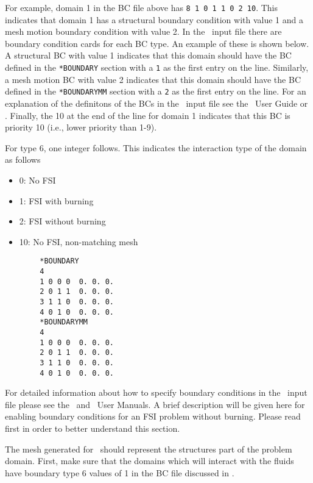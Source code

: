\begin{itemize}
\begin{itemize}
		For example, domain 1 in the BC file above has \texttt{8 1 0 1 1 0 2 10}. This indicates that domain 1 has a structural boundary condition with value 1 and a mesh motion boundary condition with value 2. In the \rocfrac\, input file there are boundary condition cards for each BC type. An example of these is shown below. A structural BC with value 1 indicates that this domain should have the BC defined in the \texttt{*BOUNDARY} section with a \texttt{1} as the first entry on the line. Similarly, a mesh motion BC with value 2 indicates that this domain should have the BC defined in the \texttt{*BOUNDARYMM} section with a \texttt{2} as the first entry on the line. For an explanation of the definitons of the BCs in the \rocfrac\, input file see the \rocfrac\, User Guide or . Finally, the 10 at the end of the line for domain 1 indicates that this BC is priority 10 (i.e., lower priority than 1-9).
	\end{itemize}
    For type 6, one integer follows. This indicates the interaction type of the domain as follows
    \begin{itemize}
    	\item 0: No FSI
    	\item 1: FSI with burning
    	\item 2: FSI without burning
    	\item 10: No FSI, non-matching mesh 
    \end{itemize}
\end{itemize}


	\begin{framed}
		\vspace{-10pt}
		\begin{verbatim}
		*BOUNDARY
		4
		1 0 0 0  0. 0. 0.
		2 0 1 1  0. 0. 0.
		3 1 1 0  0. 0. 0.
		4 0 1 0  0. 0. 0.
		*BOUNDARYMM
		4
		1 0 0 0  0. 0. 0.
		2 0 1 1  0. 0. 0.
		3 1 1 0  0. 0. 0.
		4 0 1 0  0. 0. 0.	
		\end{verbatim}
	\end{framed}	
	

For detailed information about how to specify boundary conditions in the \rocfrac\, input file please see the \rocfrac\, and \rocstar\, User Manuals. A brief description will be given here for enabling boundary conditions for an FSI problem without burning. Please read  first in order to better understand this section.
	
The mesh generated for \rocfrac\, should represent the structures part of the problem domain. First, make sure that the domains which will interact with the fluids have boundary type 6 values of 1 in the BC file discussed in . 

